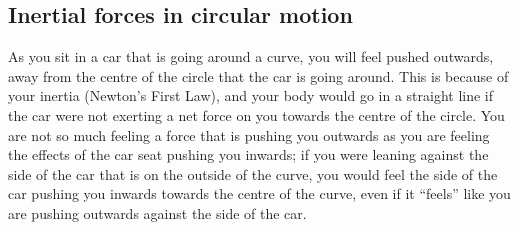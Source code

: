 \subsection{Inertial forces in circular motion}
As you sit in a car that is going around a curve, you will feel pushed outwards, away from the centre of the circle that the car is going around. This is because of your inertia (Newton's First Law), and your body would go in a straight line if the car were not exerting a net force on you towards the centre of the circle. You are not so much feeling a force that is pushing you outwards as you are feeling the effects of the car seat pushing you inwards; if you were leaning against the side of the car that is on the outside of the curve, you would feel the side of the car pushing you inwards towards the centre of the curve, even if it ``feels'' like you are pushing outwards against the side of the car.

